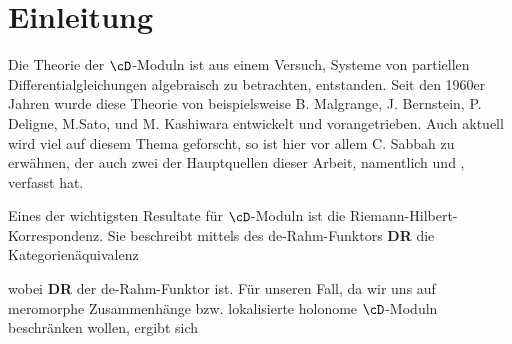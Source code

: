 \chapter{Einleitung}

Die Theorie der $\cD$-Moduln ist aus einem Versuch, Systeme von partiellen
Differentialgleichungen algebraisch zu betrachten, entstanden. Seit den 1960er
Jahren wurde diese Theorie von beispielsweise B. Malgrange, J. Bernstein, P.
Deligne, M.Sato, und M. Kashiwara entwickelt und vorangetrieben.
Auch aktuell wird viel auf diesem Thema geforscht, so ist hier vor allem
C. Sabbah zu erwähnen, der auch zwei der Hauptquellen dieser Arbeit, namentlich
\cite{sabbah_cimpa90} und \cite{sabbah_Fourier-local}, verfasst hat.

Eines der wichtigsten Resultate für $\cD$-Moduln ist die
Riemann-Hilbert-Korrespondenz. Sie beschreibt mittels des de-Rahm-Funktors
\textbf{DR} die Kategorienäquivalenz
\begin{center}
\end{center}
\iffalse
  \begin{center}
  \end{center}
  wobei \textbf{DR} der de-Rahm-Funktor ist.
  Für unseren Fall, da wir uns auf meromorphe Zusammenhänge bzw. lokalisierte
  holonome $\cD$-Moduln beschränken wollen, ergibt sich
